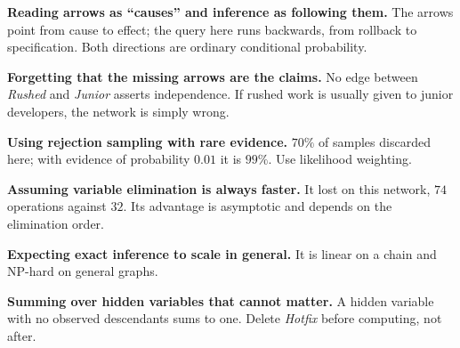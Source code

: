 \begin{pitfall}
\begin{tight}
  \item \textbf{Reading arrows as ``causes'' and inference as following them.} The
        arrows point from cause to effect; the query here runs backwards, from
        rollback to specification. Both directions are ordinary conditional
        probability.
  \item \textbf{Forgetting that the missing arrows are the claims.} No edge between
        \emph{Rushed} and \emph{Junior} asserts independence. If rushed work is
        usually given to junior developers, the network is simply wrong.
  \item \textbf{Using rejection sampling with rare evidence.} $70\%$ of samples
        discarded here; with evidence of probability $0.01$ it is $99\%$. Use
        likelihood weighting.
  \item \textbf{Assuming variable elimination is always faster.} It lost on this
        network, $74$ operations against $32$. Its advantage is asymptotic and
        depends on the elimination order.
  \item \textbf{Expecting exact inference to scale in general.} It is linear on a
        chain and NP-hard on general graphs.
  \item \textbf{Summing over hidden variables that cannot matter.} A hidden variable
        with no observed descendants sums to one. Delete \emph{Hotfix} before
        computing, not after.
\end{tight}
\end{pitfall}


